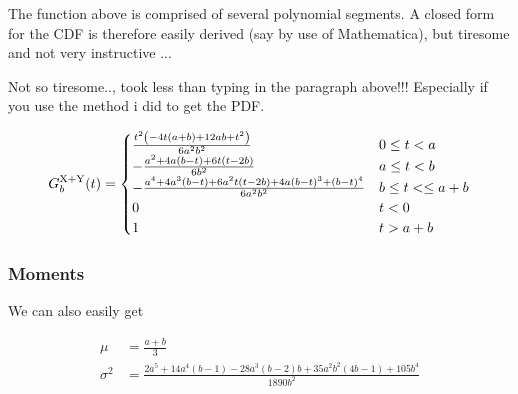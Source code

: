 The function above is comprised of several polynomial segments. A
closed form for the CDF is therefore easily derived (say by use of
Mathematica), but tiresome and not very instructive ...

Not so tiresome.., took less than typing in the paragraph above!!!
Especially if you use the method i did to get the PDF.

\begin{equation}
 G^{\rm X+Y}_b(t) =
 \begin{cases}
\frac{t^2 \left(-4 t (a+b)+12 a b+t^2\right)}{6 a^2 b^2} & 0 \le t < a \\
-\frac{a^2+4 a (b-t)+6 t (t-2 b)}{6 b^2} & a\le t <  b \\
-\frac{a^4+4 a^3 (b-t)+6 a^2 t (t-2 b)+4 a (b-t)^3+(b-t)^4}{6 a^2 b^2} & b \le t < \le  a + b\\
 0 & t < 0\\
 1 & t > a + b
 \end{cases}
\end{equation}


\subsubsection{Moments}

We can also easily get 

\begin{eqnarray}
 \mu & = \frac{a+b}{3} \\
 \sigma^{2} & = \frac{2 a^5+14 a^4 (b-1)-28 a^3 (b-2) b+35 a^2 b^2 (4 b-1)+105 b^4}{1890 b^2}
\end{eqnarray}






